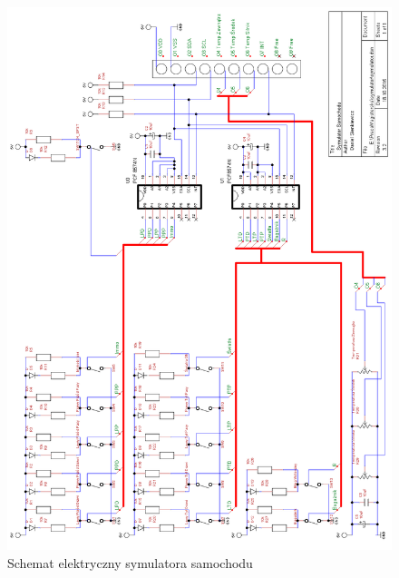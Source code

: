 \documentclass{xmgr}
\begin{document}
\begin{figure}[!hp]
    \centering
    	\includegraphics[height=0.9\textheight]{images/symulator.png}
    \caption{Schemat elektryczny symulatora samochodu}
\end{figure}
\end{document}
